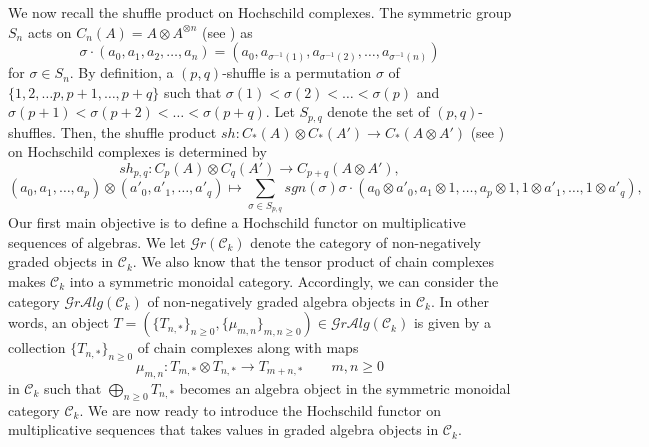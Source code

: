 \documentclass[10pt, colorlinks]{article}
\numberwithin{equation}{section} \DeclareMathSizes{2}{10}{12}{13}
\begin{document}
\smallskip
We now recall the shuffle product on Hochschild complexes. 
  The symmetric group  $S_n$ acts on $C_n(A)=A\otimes A^{\otimes n}$   (see \cite[\S 4.2.1]{LD}) as 
\begin{equation}\label{act2}
    \sigma\cdot(a_0,a_1,a_2,\ldots,a_n)=(a_0,a_{\sigma^{-1}(1)},a_{\sigma^{-1}(2)},\ldots,a_{\sigma^{-1}(n)})
\end{equation} for $\sigma\in S_n$. 
 By definition, a $(p,q)$-shuffle is a permutation $\sigma$ of $\{1,2,\ldots p,p+1,\ldots,p+q\}$ such that $\sigma(1)<\sigma(2)<\ldots<\sigma(p)$ and $\sigma(p+1)<\sigma(p+2)<\ldots<\sigma(p+q)$. Let $S_{p,q}$ denote the set of $(p,q)$-shuffles.
 Then, the shuffle product $sh:C_*(A)\otimes C_*(A')
\longrightarrow C_*(A\otimes A')$ (see \cite[\S 4.2]{LD}) on Hochschild complexes is determined by 
\begin{equation*}
    sh_{p,q}:C_p(A)\otimes C_q(A')\longrightarrow C_{p+q}(A\otimes A'),
\end{equation*}
\begin{equation}\label{SH}
     (a_0,a_1,\ldots,a_p)\otimes(a'_0,a'_1,\ldots,a'_q)\longmapsto \sum_{\sigma\in S_{p,q}}sgn(\sigma)\sigma\cdot(a_0\otimes a'_0,a_1\otimes1,\ldots,a_p\otimes1,1\otimes a'_1,\ldots,1\otimes a'_q),
\end{equation}
Our first main objective is to define a Hochschild functor on multiplicative sequences of algebras. We let  $\mathscr Gr(\mathcal C_k)$ denote the category
of non-negatively graded objects in $\mathcal C_k$. We also know that the tensor product of chain complexes makes  $\mathcal C_k$ into a symmetric monoidal category. Accordingly, we can consider the category  $\mathscr Gr\mathcal Alg(\mathcal C_k)$ of non-negatively graded algebra objects in 
$\mathcal C_k$. In other words, an object $T=(\{T_{n,*}\}_{n\geq 0},\{\mu_{m,n}\}_{m,n\geq 0} )\in \mathscr Gr\mathcal Alg(\mathcal C_k)$ is given by a collection $\{T_{n,*}\}_{n\geq 0}$ of chain complexes along with maps
\begin{equation}
\mu_{m,n}:T_{m,*}\otimes T_{n,*}\longrightarrow T_{m+n,*}\qquad m,n\geq 0
\end{equation} in $\mathcal C_k$ such that $\underset{n\geq 0}{\bigoplus} T_{n,*}$ becomes an algebra object in the symmetric monoidal category 
$\mathcal C_k$. We are now ready to introduce the Hochschild functor on multiplicative sequences that takes values in graded algebra objects in $\mathcal C_k$.
\end{document}

